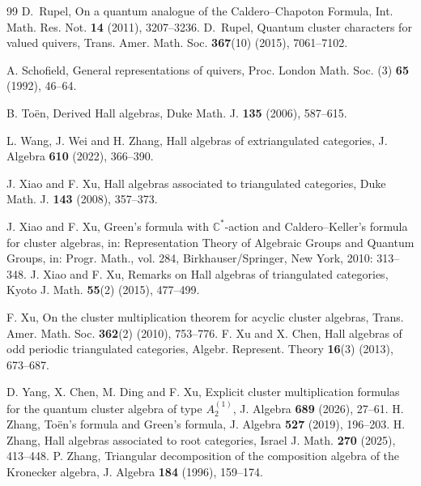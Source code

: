\documentclass[reqno,12pt]{amsart}
\numberwithin{equation}{section}
\theoremstyle{plain} %
\theoremstyle{definition} %
\begin{document}
\begin{thebibliography}{99}
 D.~Rupel, On a quantum analogue of the Caldero--Chapoton
Formula, Int. Math. Res. Not. {\bf 14} (2011), 3207--3236.
%
 D.~Rupel, Quantum cluster characters for valued quivers, Trans. Amer. Math. Soc. {\bf 367}(10) (2015), 7061--7102.


A. Schofield, {General representations of quivers}, Proc. London Math. Soc. (3) \textbf{65} (1992),
46--64.

 B. To\"en, {Derived Hall algebras}, Duke Math. J. {\bf 135} (2006), 587--615.

 L. Wang, J. Wei and H. Zhang, Hall algebras of extriangulated categories, J. Algebra {\bf 610} (2022), 366--390.


 J. Xiao and F. Xu, {Hall algebras associated to triangulated categories}, Duke Math. J. {\bf 143} (2008), 357--373.

 J. Xiao and F. Xu, {Green's formula with $\mathbb{C}^{*}$-action and Caldero--Keller's formula for cluster algebras,} in: Representation Theory of Algebraic Groups and Quantum Groups, in: Progr. Math., vol. 284, Birkhauser/Springer, New York, 2010: 313--348.
 J. Xiao and F. Xu, Remarks on Hall algebras of triangulated categories, Kyoto J. Math. {\bf 55}(2) (2015), 477--499.

 F. Xu,  On the cluster multiplication theorem for acyclic cluster algebras, Trans. Amer. Math. Soc. {\bf 362}(2) (2010), 753--776.
 F. Xu and X. Chen, Hall algebras of odd periodic triangulated categories, Algebr. Represent. Theory {\bf 16}(3) (2013), 673--687.

     D. Yang, X. Chen, M. Ding and F. Xu, Explicit cluster multiplication formulas for the quantum cluster algebra of type $A_2^{(1)}$, J. Algebra {\bf 689} (2026), 27--61.
 H. Zhang, To\"en's formula and Green's formula, J. Algebra {\bf 527} (2019), 196--203.
 H. Zhang, Hall algebras associated to root categories, Israel J. Math. {\bf 270} (2025), 413--448.
 P. Zhang, Triangular decomposition of the composition algebra of the Kronecker algebra, J. Algebra {\bf 184} (1996), 159--174.
\end{thebibliography}
\end{document}
